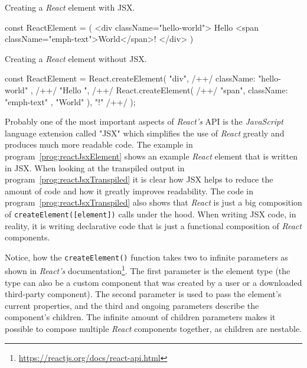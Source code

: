 \begin{program}
\caption{Creating a \emph{React} element with JSX.} 
\label{prog:reactJsxElement}
\begin{JsCode}
const ReactElement = (
  <div className="hello-world">
    Hello <span className="emph-text">World</span>!
  </div>
)
\end{JsCode}
\end{program}

\begin{program}
\caption{Creating a \emph{React} element without JSX.} 
\label{prog:reactJsxTranspiled}
\begin{JsCode}
const ReactElement = React.createElement(
  "div", /+\label{line:createReactComponent1}+/
  { className: "hello-world" }, /+\label{line:createReactComponent2}+/
  "Hello ", /+\label{line:childrenStart}+/
  React.createElement( /+\label{line:nestedCreateElement}+/
    "span", 
    { className: "emph-text" }, 
    "World"
  ), 
  "!" /+\label{line:childrenEnd}+/
);
\end{JsCode}
\end{program}

Probably one of the most important aspects of \emph{React's} API is the \emph{JavaScript} language extension called "JSX" which simplifies the use of \emph{React} greatly and produces much more readable code. The example in program~\ref{prog:reactJsxElement} shows an example \emph{React} element that is written in JSX. When looking at the transpiled output in program~\ref{prog:reactJsxTranspiled} it is clear how JSX helps to reduce the amount of code and how it greatly improves readability. The code in program~\ref{prog:reactJsxTranspiled} also shows that \emph{React} is just a big composition of \texttt{createElement([element])} calls under the hood. When writing JSX code, in reality, it is writing declarative code that is just a functional composition of \emph{React} components. 

Notice, how the \texttt{createElement()} function takes two to infinite parameters as shown in \emph{React's} documentation\footnote{\url{https://reactjs.org/docs/react-api.html}}. The first parameter is the element type (the type can also be a custom component that was created by a user or a downloaded third-party component). The second parameter is used to pass the element's current properties, and the third and ongoing parameters describe the component's children. The infinite amount of children parameters makes it possible to compose multiple \emph{React} components together, as children are nestable. 

